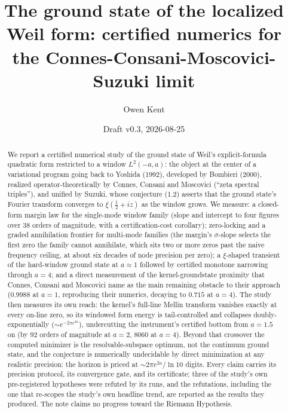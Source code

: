 \documentclass[10pt]{article}
\title{The ground state of the localized Weil form: certified numerics for the Connes-Consani-Moscovici-Suzuki limit}
\author{Owen Kent}
\date{Draft v0.3, 2026-08-25}
\begin{document}
\maketitle

\begin{abstract}
We report a certified numerical study of the ground state of Weil's explicit-formula quadratic form restricted to a window $L^2(-a,a)$: the object at the center of a variational program going back to Yoshida (1992), developed by Bombieri (2000), realized operator-theoretically by Connes, Consani and Moscovici (``zeta spectral triples''), and unified by Suzuki, whose conjecture (1.2) asserts that the ground state's Fourier transform converges to $\xi(\tfrac12 + iz)$ as the window grows. We measure: a closed-form margin law for the single-mode window family (slope and intercept to four figures over 38 orders of magnitude, with a certification-cost corollary); zero-locking and a graded annihilation frontier for multi-mode families (the margin's $\sigma$-slope selects the first zero the family cannot annihilate, which sits two or more zeros past the naive frequency ceiling, at about six decades of node precision per zero); a $\xi$-shaped transient of the hard-window ground state at $a \approx 1$ followed by certified monotone narrowing through $a = 4$; and a direct measurement of the kernel-groundstate proximity that Connes, Consani and Moscovici name as the main remaining obstacle to their approach ($0.9988$ at $a = 1$, reproducing their numerics, decaying to $0.715$ at $a = 4$). The study then measures its own reach: the kernel's full-line Mellin transform vanishes exactly at every on-line zero, so its windowed form energy is tail-controlled and collapses doubly-exponentially ($\sim e^{-2\pi e^{2a}}$), undercutting the instrument's certified bottom from $a = 1.5$ on (by 92 orders of magnitude at $a = 2$, 8060 at $a = 4$). Beyond that crossover the computed minimizer is the resolvable-subspace optimum, not the continuum ground state, and the conjecture is numerically undecidable by direct minimization at any realistic precision: the horizon is priced at $\sim 2\pi e^{2a}/\ln 10$ digits. Every claim carries its precision protocol, its convergence gate, and its certificate; three of the study's own pre-registered hypotheses were refuted by its runs, and the refutations, including the one that re-scopes the study's own headline trend, are reported as the results they produced. The note claims no progress toward the Riemann Hypothesis.
\end{abstract}
\end{document}
